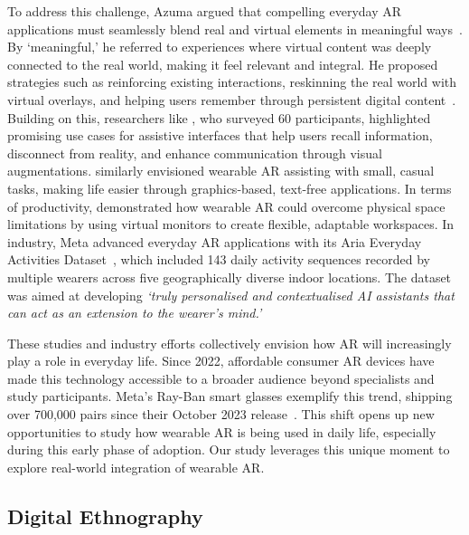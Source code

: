 To address this challenge, Azuma argued that compelling everyday AR applications must seamlessly blend real and virtual elements in meaningful ways~\cite{azuma2019road}. By `meaningful,' he referred to experiences where virtual content was deeply connected to the real world, making it feel relevant and integral. He proposed strategies such as reinforcing existing interactions, reskinning the real world with virtual overlays, and helping users remember through persistent digital content~\cite{azuma2015location}. Building on this, researchers like \citet{mathis2024everyday}, who surveyed 60 participants, highlighted promising use cases for assistive interfaces that help users recall information, disconnect from reality, and enhance communication through visual augmentations. \citet{glassner2003everyday} similarly envisioned wearable AR assisting with small, casual tasks, making life easier through graphics-based, text-free applications. In terms of productivity, \citet{pavanatto2021we, pavanatto2024multiple} demonstrated how wearable AR could overcome physical space limitations by using virtual monitors to create flexible, adaptable workspaces. In industry, Meta advanced everyday AR applications with its Aria Everyday Activities Dataset~\cite{lv2024aria}, which included 143 daily activity sequences recorded by multiple wearers across five geographically diverse indoor locations. The dataset was aimed at developing \textit{`truly personalised and contextualised AI assistants that can act as an extension to the wearer’s mind.'}

These studies and industry efforts collectively envision how AR will increasingly play a role in everyday life. Since 2022, affordable consumer AR devices have made this technology accessible to a broader audience beyond specialists and study participants. Meta's Ray-Ban smart glasses exemplify this trend, shipping over 700,000 pairs since their October 2023 release~\cite{wsj2023}. This shift opens up new opportunities to study how wearable AR is being used in daily life, especially during this early phase of adoption. Our study leverages this unique moment to explore real-world integration of wearable AR.

\subsection{Digital Ethnography} 


